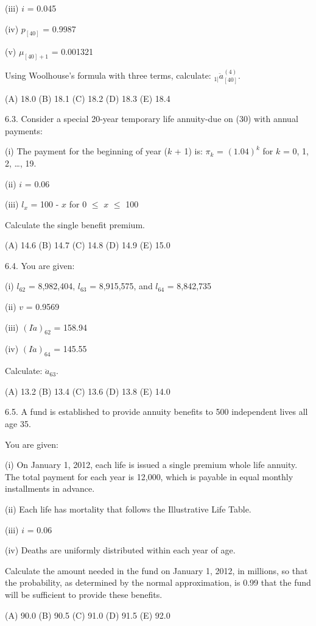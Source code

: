 \documentclass[]{book}
\begin{document}
(iii) \(i\) = 0.045

(iv) \(p_{[40]}\) = 0.9987

(v) \(\mu_{[40] + 1}\) = 0.001321

Using Woolhouse's formula with three terms, calculate:
\({}_{1|}\ddot{a}^{(4)}_{[40]}\).

(A) 18.0 (B) 18.1 (C) 18.2 (D) 18.3 (E) 18.4

6.3. Consider a special 20-year temporary life annuity-due on (30) with
annual payments:

(i) The payment for the beginning of year (\(k\) + 1) is: \(\pi_k\) =
\((1.04)^k\) for \(k\) = 0, 1, 2, \ldots{}, 19.

(ii) \(i\) = 0.06

(iii) \(l_x\) = 100 - \(x\) for 0 \(\le\) \(x\) \(\le\) 100

Calculate the single benefit premium.

(A) 14.6 (B) 14.7 (C) 14.8 (D) 14.9 (E) 15.0

6.4. You are given:

(i) \(l_{62}\) = 8,982,404, \(l_{63}\) = 8,915,575, and \(l_{64}\) =
8,842,735

(ii) \(v\) = 0.9569

(iii) \((I\ddot{a})_{62}\) = 158.94

(iv) \((I\ddot{a})_{64}\) = 145.55

Calculate: \(\ddot{a}_{63}\).

(A) 13.2 (B) 13.4 (C) 13.6 (D) 13.8 (E) 14.0

6.5. A fund is established to provide annuity benefits to 500
independent lives all age 35.

You are given:

(i) On January 1, 2012, each life is issued a single premium whole life
annuity. The total payment for each year is 12,000, which is payable in
equal monthly installments in advance.

(ii) Each life has mortality that follows the Illustrative Life Table.

(iii) \(i\) = 0.06

(iv) Deaths are uniformly distributed within each year of age.

Calculate the amount needed in the fund on January 1, 2012, in millions,
so that the probability, as determined by the normal approximation, is
0.99 that the fund will be sufficient to provide these benefits.

(A) 90.0 (B) 90.5 (C) 91.0 (D) 91.5 (E) 92.0
\end{document}
